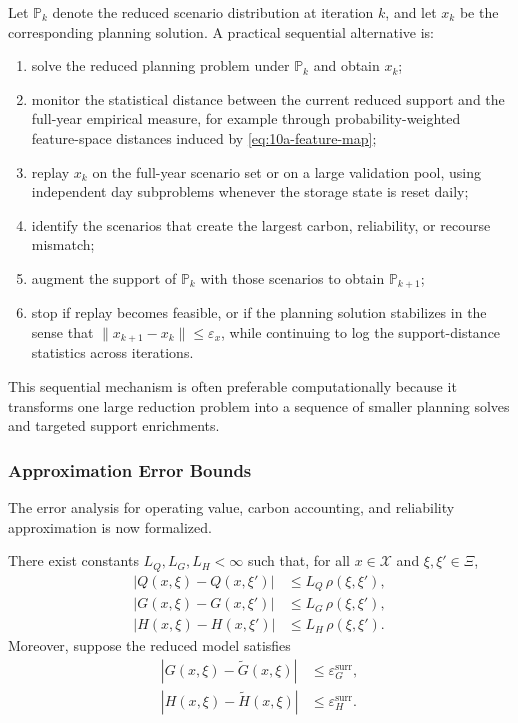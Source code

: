 Let \(\mathbb{P}_k\) denote the reduced scenario distribution at iteration \(k\), and let \(x_k\) be the corresponding planning solution. A practical sequential alternative is:
\begin{enumerate}
  \item solve the reduced planning problem under \(\mathbb{P}_k\) and obtain \(x_k\);
  \item monitor the statistical distance between the current reduced support and the full-year empirical measure, for example through probability-weighted feature-space distances induced by \eqref{eq:10a-feature-map};
  \item replay \(x_k\) on the full-year scenario set or on a large validation pool, using independent day subproblems whenever the storage state is reset daily;
  \item identify the scenarios that create the largest carbon, reliability, or recourse mismatch;
  \item augment the support of \(\mathbb{P}_k\) with those scenarios to obtain \(\mathbb{P}_{k+1}\);
  \item stop if replay becomes feasible, or if the planning solution stabilizes in the sense that \(\|x_{k+1}-x_k\|\le \varepsilon_x\), while continuing to log the support-distance statistics across iterations.
\end{enumerate}

This sequential mechanism is often preferable computationally because it transforms one large reduction problem into a sequence of smaller planning solves and targeted support enrichments.

\subsubsection{Approximation Error Bounds}

The error analysis for operating value, carbon accounting, and reliability approximation is now formalized.

\begin{assumption}
There exist constants \(L_Q,L_G,L_H<\infty\) such that, for all \(x\in\mathcal{X}\) and \(\xi,\xi'\in\Xi\),
\begin{align}
|Q(x,\xi)-Q(x,\xi')| &\le L_Q\,\rho(\xi,\xi'),
\label{eq:10a-lipschitz-q}\\
|G(x,\xi)-G(x,\xi')| &\le L_G\,\rho(\xi,\xi'),
\label{eq:10a-lipschitz-g}\\
|H(x,\xi)-H(x,\xi')| &\le L_H\,\rho(\xi,\xi').
\label{eq:10a-lipschitz-h}
\end{align}
Moreover, suppose the reduced model satisfies
\begin{align}
|G(x,\xi)-\widetilde G(x,\xi)| &\le \varepsilon_G^{\mathrm{surr}},
\label{eq:10a-carbon-surrogate-error}\\
|H(x,\xi)-\widetilde H(x,\xi)| &\le \varepsilon_H^{\mathrm{surr}}.
\label{eq:10a-reliability-surrogate-error}
\end{align}
\end{assumption}

